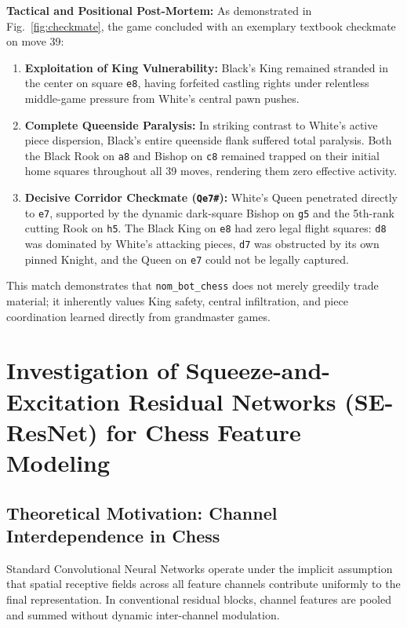 \documentclass[10pt,journal,compsoc]{IEEEtran}
\begin{document}
\textbf{Tactical and Positional Post-Mortem:}
As demonstrated in Fig.~\ref{fig:checkmate}, the game concluded with an exemplary textbook checkmate on move 39:
\begin{enumerate}
    \item \textbf{Exploitation of King Vulnerability:} Black's King remained stranded in the center on square \texttt{e8}, having forfeited castling rights under relentless middle-game pressure from White's central pawn pushes.
    \item \textbf{Complete Queenside Paralysis:} In striking contrast to White's active piece dispersion, Black's entire queenside flank suffered total paralysis. Both the Black Rook on \texttt{a8} and Bishop on \texttt{c8} remained trapped on their initial home squares throughout all 39 moves, rendering them zero effective activity.
    \item \textbf{Decisive Corridor Checkmate (\texttt{Qe7\#}):} White's Queen penetrated directly to \texttt{e7}, supported by the dynamic dark-square Bishop on \texttt{g5} and the 5th-rank cutting Rook on \texttt{h5}. The Black King on \texttt{e8} had zero legal flight squares: \texttt{d8} was dominated by White's attacking pieces, \texttt{d7} was obstructed by its own pinned Knight, and the Queen on \texttt{e7} could not be legally captured.
\end{enumerate}

This match demonstrates that \texttt{nom\_bot\_chess} does not merely greedily trade material; it inherently values King safety, central infiltration, and piece coordination learned directly from grandmaster games.

\section{Investigation of Squeeze-and-Excitation Residual Networks (SE-ResNet) for Chess Feature Modeling}
\label{sec:se_resnet}

\subsection{Theoretical Motivation: Channel Interdependence in Chess}
Standard Convolutional Neural Networks operate under the implicit assumption that spatial receptive fields across all feature channels contribute uniformly to the final representation. In conventional residual blocks, channel features are pooled and summed without dynamic inter-channel modulation.
\end{document}

